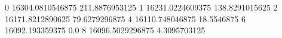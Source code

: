 0 16304.0810546875 211.8876953125
1 16231.0224609375 138.8291015625
2 16171.8212890625 79.6279296875
4 16110.748046875 18.5546875
6 16092.193359375 0.0
8 16096.5029296875 4.3095703125
